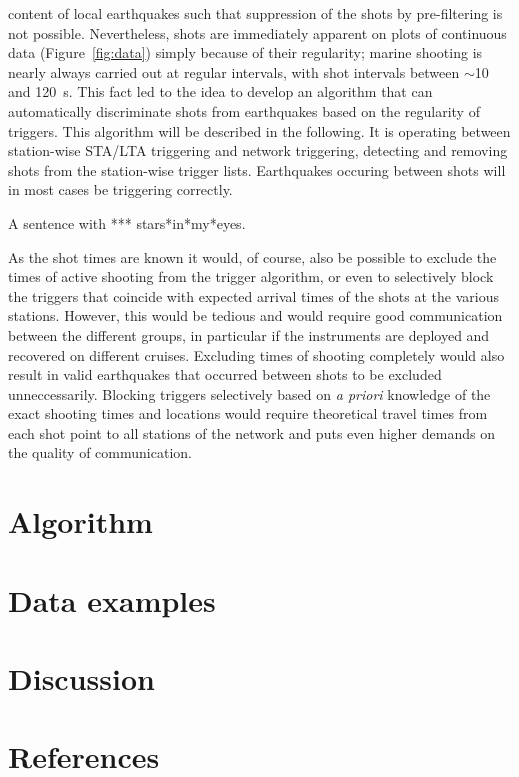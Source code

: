 \documentclass[11pt]{article}
\begin{document}
content of local earthquakes such that suppression of the shots by
pre-filtering is not possible.    Nevertheless, shots are immediately
apparent on plots of continuous data (Figure~\ref{fig:data})
simply because of their regularity; marine shooting is nearly always
carried out at regular intervals, with shot intervals between
$\sim$10 and 120~s.   This fact led to the idea to develop
an algorithm that can automatically discriminate shots from
earthquakes based on the regularity of triggers.  This algorithm will
be described in the following.  It is operating between station-wise STA/LTA
triggering and network triggering, detecting and removing shots from
the station-wise trigger lists.   Earthquakes occuring between shots
will in most cases be triggering correctly.

A sentence with *** stars*in*my*eyes.

  As the shot times are known it would, of course, also be possible to
  exclude the times of active shooting 
from the trigger algorithm, or even to selectively block the
triggers that coincide with expected arrival times of the shots at the
various stations.  However, this would be tedious and would require
good communication between the different groups, in particular if the
instruments are deployed and recovered on different cruises.
Excluding times of shooting completely would also result in valid
earthquakes that occurred between shots to be excluded
unneccessarily.  Blocking triggers selectively based on {\it a priori}
knowledge of the exact shooting times and locations would require theoretical travel times
from each shot point to all stations of the network and puts even
higher demands on the quality of communication.


\section{Algorithm}

\section{Data examples}

\section{Discussion}

\section*{References}
\end{document}
